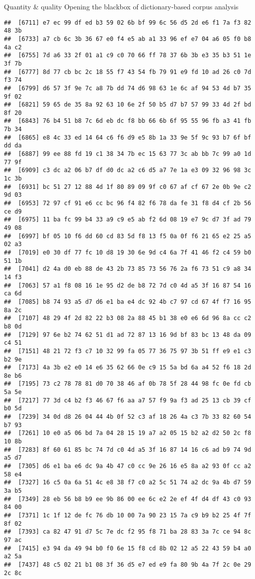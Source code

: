 \documentclass[
  ignorenonframetext,
]{beamer}
\begin{document}
\begin{frame}[fragile]{Quantity \& quality \textbar{} Opening the
blackbox of dictionary-based corpus analysis}
\begin{verbatim}
##  [6711] e7 ec 99 df ed b3 59 02 6b bf 99 6c 56 d5 2d e6 f1 7a f3 82 48 3b
##  [6733] a7 cb 6c 3b 36 67 e0 f4 e5 ab a1 33 96 ef e7 04 a6 05 f0 b8 4a c2
##  [6755] 7d a6 33 2f 01 a1 c9 c0 70 66 ff 78 37 6b 3b e3 35 b3 51 1e 3f 7b
##  [6777] 8d 77 cb bc 2c 18 55 f7 43 54 fb 79 91 e9 fd 10 ad 26 c0 7d f3 74
##  [6799] d6 57 3f 9e 7c a8 7b dd 74 d6 98 63 1e 6c af 94 53 4d b7 35 9f 02
##  [6821] 59 65 de 35 8a 92 63 10 6e 2f 50 b5 d7 b7 57 99 33 4d 2f bd 8f 20
##  [6843] 76 b4 51 b8 7c 6d eb dc f8 bb 66 6b 6f 95 55 96 fb a3 41 fb 7b 34
##  [6865] e8 4c 33 ed 14 64 c6 f6 d9 e5 8b 1a 33 9e 5f 9c 93 b7 6f bf dd da
##  [6887] 99 ee 88 fd 19 c1 38 34 7b ec 15 63 77 3c ab bb 7c 99 a0 1d 77 9f
##  [6909] c3 dc a2 06 b7 df d0 dc a2 c6 d5 a7 7e 1a e3 09 32 96 98 3c 1c 3b
##  [6931] bc 51 27 12 88 4d 1f 80 89 09 9f c0 67 af cf 67 2e 0b 9e c2 9d 03
##  [6953] 72 97 cf 91 e6 cc bc 96 f4 82 f6 78 da fe 31 f8 d4 cf 2b 56 ce d9
##  [6975] 11 ba fc 99 b4 33 a9 c9 e5 ab f2 6d 08 19 e7 9c d7 3f ad 79 49 08
##  [6997] bf 05 10 f6 dd 60 cd 83 5d f8 13 f5 0a 0f f6 21 65 e2 25 a5 02 a3
##  [7019] e0 30 df 77 fc 10 d8 19 30 6e 9d c4 6a 7f 41 46 f2 c4 59 b0 51 1b
##  [7041] d2 4a d0 eb 88 de 43 2b 73 85 73 56 76 2a f6 73 51 c9 a8 34 14 f3
##  [7063] 57 a1 f8 08 16 1e 95 d2 de b8 72 7d c0 4d a5 3f 16 87 54 16 ca 6d
##  [7085] b8 74 93 a5 d7 d6 e1 ba e4 dc 92 4b c7 97 cd 67 4f f7 16 95 8a 2c
##  [7107] 48 29 4f 2d 82 22 b3 08 2a 88 45 b1 38 e0 e6 6d 96 8a cc c2 b8 0d
##  [7129] 97 6e b2 74 62 51 d1 ad 72 87 13 16 9d bf 83 bc 13 48 da 09 c4 51
##  [7151] 48 21 72 f3 c7 10 32 99 fa 05 77 36 75 97 3b 51 ff e9 e1 c3 b2 9e
##  [7173] 4a 3b e2 e0 14 e6 35 62 66 0e c9 15 5a bd 6a a4 52 f6 18 2d 8e b6
##  [7195] 73 c2 78 78 81 d0 70 38 46 af 0b 78 5f 28 44 98 fc 0e fd cb 5a 5e
##  [7217] 77 3d c4 b2 f3 46 67 f6 aa a7 57 f9 9a f3 ad 25 13 cb 39 cf b0 5d
##  [7239] 34 0d d8 26 04 44 4b 0f 52 c3 af 18 26 4a c3 7b 33 82 60 54 b7 93
##  [7261] 10 e0 a5 06 bd 7a 04 28 15 19 a7 a2 05 15 b2 a2 d2 50 2c f8 10 8b
##  [7283] 8f 60 61 85 bc 74 7d c0 4d a5 3f 16 87 14 16 c6 ad b9 74 9d a5 d7
##  [7305] d6 e1 ba e6 dc 9a 4b 47 c0 cc 9e 26 16 e5 8a a2 93 0f cc a2 58 e4
##  [7327] 16 c5 0a 6a 51 4c e8 38 f7 c0 a2 5c 51 74 a2 dc 9a 4b d7 59 3a b5
##  [7349] 28 eb 56 b8 b9 ee 9b 86 00 ee 6c e2 2e ef 4f d4 df 43 c0 93 84 00
##  [7371] 1c 1f 12 de fc 76 db 10 00 7a 90 23 15 7a c9 b9 b2 25 4f 7f 8f 02
##  [7393] ca 82 47 91 d7 5c 7e dc f2 95 f8 71 ba 28 83 3a 7c ce 94 8c 97 ac
##  [7415] e3 94 da 49 94 b0 f0 6e 15 f8 cd 8b 02 12 a5 22 43 59 b4 a0 a2 5a
##  [7437] 48 c5 02 21 b1 08 3f 36 d5 e7 ed e9 fa 80 9b 4a 7f 2c 0e 29 2c 8c

\end{verbatim}
\end{frame}
\end{document}
